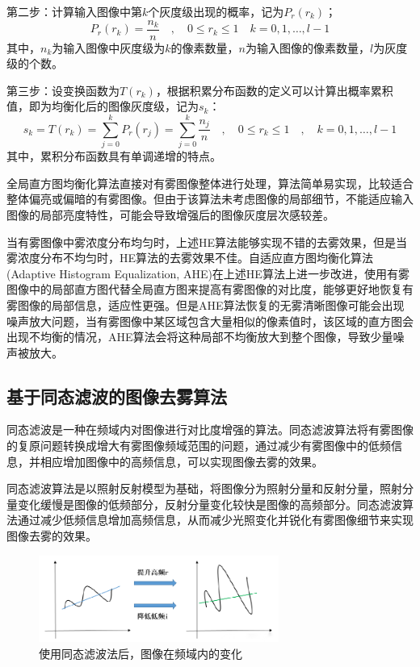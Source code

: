 \documentclass[12pt]{article}
\begin{document}
第二步：计算输入图像中第$k$个灰度级出现的概率，记为$P_r(r_k)$；
\begin{equation}
    P_r(r_k)=\frac{n_k}{n} \quad , \quad 0\leq r_k \leq 1 \quad k=0,1,\dots ,l-1
\end{equation}
其中，$n_k$为输入图像中灰度级为$k$的像素数量，$n$为输入图像的像素数量，$l$为灰度级的个数。

第三步：设变换函数为$T(r_k)$，根据积累分布函数的定义可以计算出概率累积值，即为均衡化后的图像灰度级，记为$s_k$：
\begin{equation}
    s_k=T(r_k)=\sum_{j=0}^{k}{P_r(r_j)}=\sum_{j=0}^{k}{\frac{n_j}{n}}
    \quad,\quad 0\leq r_k \leq 1 \quad , \quad k=0,1,\dots ,l-1
\end{equation}
其中，累积分布函数具有单调递增的特点。

全局直方图均衡化算法直接对有雾图像整体进行处理，算法简单易实现，比较适合整体偏亮或偏暗的有雾图像。但由于该算法未考虑图像的局部细节，不能适应输入图像的局部亮度特性，可能会导致增强后的图像灰度层次感较差。

当有雾图像中雾浓度分布均匀时，上述HE算法能够实现不错的去雾效果，但是当雾浓度分布不均匀时，HE算法的去雾效果不佳。自适应直方图均衡化算法(Adaptive Histogram Equalization, AHE)在上述HE算法上进一步改进，使用有雾图像中的局部直方图代替全局直方图来提高有雾图像的对比度，能够更好地恢复有雾图像的局部信息，适应性更强。但是AHE算法恢复的无雾清晰图像可能会出现噪声放大问题，当有雾图像中某区域包含大量相似的像素值时，该区域的直方图会出现不均衡的情况，AHE算法会将这种局部不均衡放大到整个图像，导致少量噪声被放大。

\subsection{基于同态滤波的图像去雾算法}

同态滤波是一种在频域内对图像进行对比度增强的算法。同态滤波算法将有雾图像的复原问题转换成增大有雾图像频域范围的问题，通过减少有雾图像中的低频信息，并相应增加图像中的高频信息，可以实现图像去雾的效果。

同态滤波算法是以照射反射模型为基础，将图像分为照射分量和反射分量，照射分量变化缓慢是图像的低频部分，反射分量变化较快是图像的高频部分。同态滤波算法通过减少低频信息增加高频信息，从而减少光照变化并锐化有雾图像细节来实现图像去雾的效果。

\begin{figure}[h]
    \centering
    \includegraphics[width=0.7\textwidth]{pic/pic2.png}
    \caption{使用同态滤波法后，图像在频域内的变化}
\end{figure}
\end{document}
